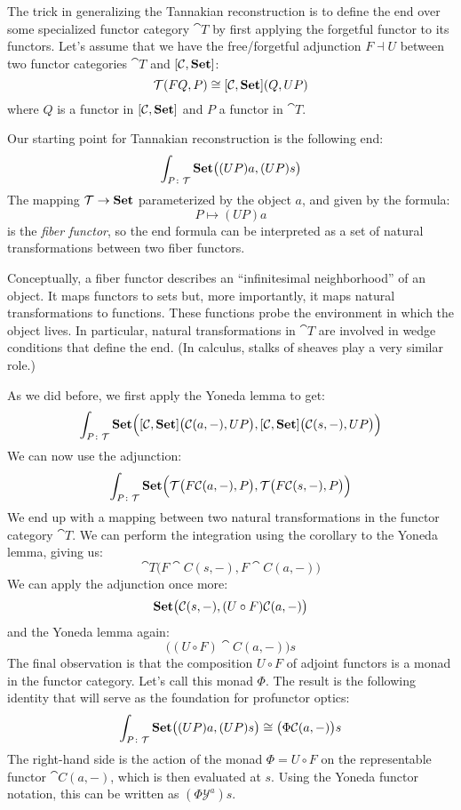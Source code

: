 \documentclass[DaoFP]{subfiles}
\begin{document}
The trick in generalizing the Tannakian reconstruction is to define the end over some specialized functor category $\cat T$ by first applying the forgetful functor to its functors. Let's assume that we have the free/forgetful adjunction $F \dashv U$ between two functor categories $\cat T$ and $[\mathcal{C}, \mathbf{Set}]$:
\[ \mathcal{T} (F Q, P) \cong  [\mathcal{C}, \mathbf{Set}] ( Q, U P )\]
where $Q$ is a functor in $[\mathcal{C}, \mathbf{Set}]$ and $P$ a functor in $\cat T$.

Our starting point for Tannakian reconstruction is the following end:
\[ \int_{P \colon \mathcal{T}} \mathbf{Set} \big((U P) a, (U P) s\big) \]
The mapping $\mathcal{T} \to \mathbf{Set}$ parameterized by the object $a$, and given by the formula:
\[ P \mapsto (U P) a \]
is the \emph{fiber functor}, so the end formula can be interpreted as a set of natural transformations between two fiber functors. 

Conceptually, a fiber functor describes an ``infinitesimal neighborhood'' of an object. It maps functors to sets but, more importantly, it maps natural transformations to functions. These functions probe the environment in which the object lives. In particular, natural transformations in $\cat T$ are involved in wedge conditions that define the end. (In calculus, stalks of sheaves play a very similar role.)

As we did before, we first apply the Yoneda lemma to get:
\[ \int_{P \colon \mathcal{T}} \mathbf{Set} \Big([\mathcal{C}, \mathbf{Set}] \big( \mathcal{C} (a ,-), U P\big), [\mathcal{C}, \mathbf{Set}] \big( \mathcal{C} (s ,-), U P\big)\Big) \]
We can now use the adjunction:
\[ \int_{P \colon \mathcal{T}} \mathbf{Set} \Big(\mathcal{T} \big( F \mathcal{C} (a ,-), P\big), \mathcal{T} \big( F \mathcal{C} (s ,-), P\big)\Big) \]
We end up with a mapping between two natural transformations in the functor category $\cat T$. We can perform the integration using the corollary to the Yoneda lemma, giving us:
\[ \cat T\big( F \cat C (s ,-), F \cat C (a ,-) \big) \]
We can apply the adjunction once more:
\[ \mathbf{Set} \big( \mathcal{C} (s ,-), (U\circ F) \mathcal{C} (a ,-) \big) \]
and the Yoneda lemma again:
\[ \big( (U\circ F) \cat C (a ,-) \big) s \]
The final observation is that the composition $U \circ F$ of adjoint functors is a monad in the functor category. Let's call this monad $\Phi$. The result is the following identity that will serve as the foundation for profunctor optics:
\[ \int_{P \colon \mathcal{T}} \mathbf{Set} \big((U P) a, (U P) s\big) \cong \big( \Phi \mathcal{C} (a ,-) \big) s \]
The right-hand side is the action of the monad $\Phi = U \circ F$ on the representable functor $\cat C (a, -)$, which is then evaluated at $s$. Using the Yoneda functor notation, this can be written as $(\Phi \mathcal Y^a) s$.
\end{document}
